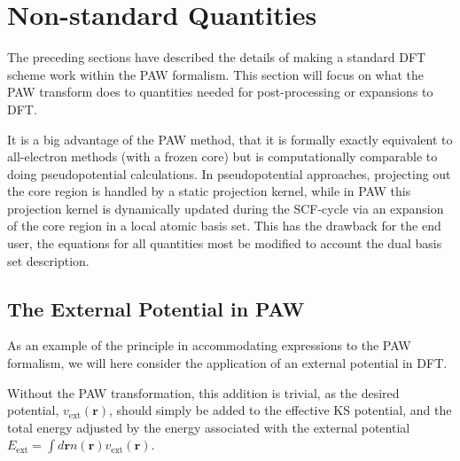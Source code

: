 \documentclass[a4paper]{article}
\newcommand{\ext}{\text{ext}}
\newcommand{\br}{\mathbf{r}}
\begin{document}
\section{Non-standard Quantities}
The preceding sections have described the details of making a
standard DFT scheme work within the PAW formalism. This section will
focus on what the PAW transform does to quantities needed for
post-processing or expansions to DFT.

It is a big advantage of the PAW method, that it is formally exactly
equivalent to all-electron methods (with a frozen core) but is
computationally comparable to doing pseudopotential calculations. In
pseudopotential approaches, projecting out the core region is handled
by a static projection kernel, while in PAW this projection kernel is
dynamically updated during the SCF-cycle via an expansion of the core
region in a local atomic basis set. This has the drawback for the end
user, the equations for all quantities most be modified to account the
dual basis set description.

\subsection{The External Potential in PAW}
As an example of the principle in accommodating expressions to the PAW
formalism, we will here consider the application of an external
potential in DFT.

Without the PAW transformation, this addition is trivial, as the
desired potential, $v_\ext(\br)$, should simply be added to the
effective KS potential, and the total energy adjusted by the energy
associated with the external potential $E_\ext = \int d\br n(\br)
v_\ext(\br)$.
\end{document}
